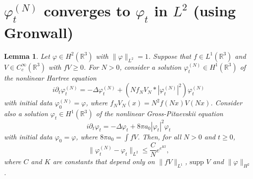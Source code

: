 \documentclass[11pt,a4paper]{scrartcl} %
\newtheorem{lem}[thm]{Lemma}
\newcommand{\R}{\mathds{R}}
\begin{document}
\section{$\varphi_t^{(N)}$ converges to $\varphi_t$ in $L^2$ (using Gronwall)}


\begin{lem}
  Let $\varphi \in H^2(\R^3)$ with $\| \varphi \|_{L^2} = 1$. Suppose that $f
  \in L^1(\R^3)$ and $V \in C_c^\infty(\R^3)$ with $fV \ge 0$. For $N > 0$,
  consider a solution $\varphi_t^{(N)} \in H^1(\R^3)$ of the nonlinear Hartree
  equation
  \begin{displaymath}
    i \partial_t \varphi_t^{(N)} = - \Delta \varphi_t^{(N)} + (N f_N V_N *
    |\varphi_t^{(N)}|^2) \varphi_t^{(N)}
  \end{displaymath}
  with initial data $\varphi^{(N)}_0 = \varphi$, where $f_N V_N(x) = N^2
  f(Nx)V(Nx)$. Consider also a solution $\varphi_t \in H^1(\R^3)$ of the
  nonlinear Gross-Pitaevskii equation
  \begin{displaymath}
    i \partial_t \varphi_t = - \Delta \varphi_t + 8 \pi a_0 |\varphi_t|^2
    \varphi_t
  \end{displaymath}
  with initial data $\varphi_0 = \varphi$, where $8 \pi a_0 = \int f V$. Then,
  for all $N > 0$ and $t \ge 0$,
  \begin{displaymath}
    \| \varphi_t^{(N)} - \varphi_t \|_{L^2} \le \frac{C}{N} e^{e^{K t}},
  \end{displaymath}
  where $C$ and $K$ are constants that depend only on $\| fV \|_{L^1}$,
  $\text{supp }V$ and $\| \varphi \|_{H^2}$. 
\end{lem}
\end{document}
